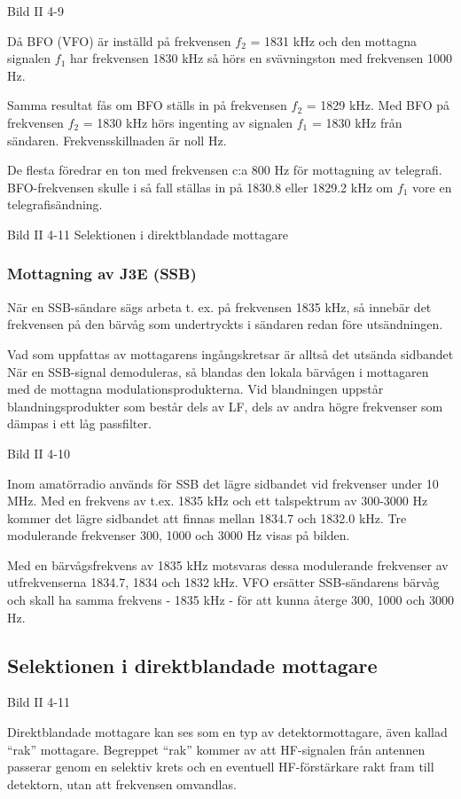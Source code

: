 Bild II 4-9

Då BFO (VFO) är inställd på frekvensen \(f_2\) = 1831 kHz och den
mottagna signalen \(f_1\) har frekvensen 1830 kHz så hörs en
svävningston med frekvensen 1000 Hz.

Samma resultat fås om BFO ställs in på frekvensen \(f_2\) = 1829
kHz. Med BFO på frekvensen \(f_2\) = 1830 kHz hörs ingenting av
signalen \(f_1\) = 1830 kHz från sändaren.  Frekvensskillnaden är noll
Hz.

De flesta föredrar en ton med frekvensen c:a 800 Hz för mottagning av
telegrafi. BFO-frekvensen skulle i så fall ställas in på 1830.8 eller
1829.2 kHz om \(f_1\) vore en telegrafisändning.

Bild II 4-11 Selektionen i direktblandade mottagare

\subsubsection{Mottagning av J3E (SSB)}

När en SSB-sändare sägs arbeta t. ex. på frekvensen 1835 kHz, så
innebär det frekvensen på den bärvåg som undertryckts i sändaren redan
före utsändningen.

Vad som uppfattas av mottagarens ingångskretsar är alltså det utsända
sidbandet När en SSB-signal demoduleras, så blandas den lokala
bärvågen i mottagaren med de mottagna modulationsprodukterna.  Vid
blandningen uppstår blandningsprodukter som består dels av LF, dels av
andra högre frekvenser som dämpas i ett låg passfilter.

Bild II 4-10

Inom amatörradio används för SSB det lägre sidbandet vid frekvenser
under 10 MHz.  Med en frekvens av t.ex. 1835 kHz och ett talspektrum
av 300-3000 Hz kommer det lägre sidbandet att finnas mellan 1834.7 och
1832.0 kHz. Tre modulerande frekvenser 300, 1000 och 3000 Hz visas på
bilden.

Med en bärvågsfrekvens av 1835 kHz motsvaras dessa modulerande
frekvenser av utfrekvenserna 1834.7, 1834 och 1832 kHz. VFO ersätter
SSB-sändarens bärvåg och skall ha samma frekvens - 1835 kHz - för att
kunna återge 300, 1000 och 3000 Hz.

\subsection{Selektionen i direktblandade mottagare}

Bild II 4-11

Direktblandade mottagare kan ses som en typ av detektormottagare, även
kallad ``rak'' mottagare. Begreppet ``rak'' kommer av att HF-signalen från
antennen passerar genom en selektiv krets och en eventuell
HF-förstärkare rakt fram till detektorn, utan att frekvensen omvandlas.

